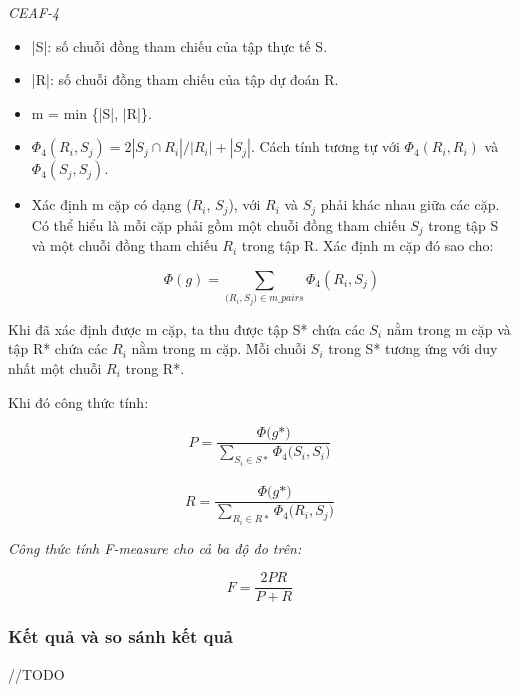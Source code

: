 \documentclass[12pt]{extarticle}
\begin{document}
						\textit{CEAF-4}
					\begin{itemize}
						\item{|S|: số chuỗi đồng tham chiếu của tập thực tế S.}
						\item{|R|: số chuỗi đồng tham chiếu của tập dự đoán R.}
						\item{m = min \{|S|, |R|\}.}
						\item{$\Phi_4(R_i,S_j) = 2 |S_j \cap R_i|/ |R_i| + |S_j|$. Cách tính tương tự với $\Phi_4(R_i,R_i)$ và $\Phi_4(S_j,S_j)$.}  
						\item{Xác định m cặp có dạng ($R_i$, $S_j$), với $R_i$ và $S_j$ phải khác nhau giữa các cặp. Có thể hiểu là mỗi cặp phải gồm một chuỗi đồng tham chiếu $S_j$ trong tập S và một chuỗi đồng tham chiếu $R_i$ trong tập R. Xác định m cặp đó sao cho: 
						\begin{center}
							\begin{equation*}
								\Phi(g) = \sum_{\big(R_i,S_j) \in m\_pairs} \Phi_4(R_i,S_j)
							\end{equation*}
						\end{center}}
					\end{itemize}
					\par Khi đã xác định được m cặp, ta thu được tập S* chứa các $S_i$ nằm trong m cặp và tập R* chứa các $R_i$ nằm trong m cặp. Mỗi chuỗi $S_i$ trong S* tương ứng với duy nhất một chuỗi $R_i$ trong R*.
					\par Khi đó công thức tính:						
						\begin{center}
							\begin{equation*}
								P = \frac{\Phi \big(g*)}{\sum_{S_i \in S*}\Phi_4 \big(S_i, S_i)}
							\end{equation*}
							\\
							\begin{equation*}
								R = \frac{\Phi \big(g*)}{\sum_{R_i \in R*}\Phi_4 \big(R_i, S_j)}
							\end{equation*}					
						\end{center}

				\par \textit{Công thức tính F-measure cho cả ba độ đo trên:}
					\begin{center}					
						\begin{equation*}
							F = \frac{2PR}{P+R}
						\end{equation*}
					\end{center}

			\subsubsection*{Kết quả và so sánh kết quả}
			//TODO
\end{document}
